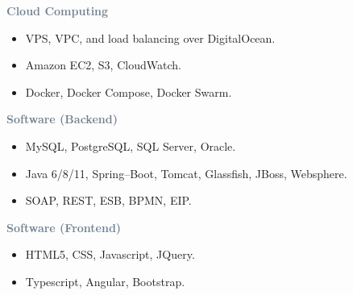 






\textcolor{SlateGrey}{\textbf{Cloud Computing}}
\newline

\begin{itemize}
    \item VPS, VPC, and load balancing over DigitalOcean.
    \item Amazon EC2, S3, CloudWatch.
    \item Docker, Docker Compose, Docker Swarm.
\end{itemize}

\textcolor{SlateGrey}{\textbf{Software (Backend)}}
\newline

\begin{itemize}
    \item MySQL, PostgreSQL, SQL Server, Oracle.
    \item Java 6/8/11, Spring--Boot, Tomcat, Glassfish, JBoss, Websphere.
    \item SOAP, REST, ESB, BPMN, EIP.
\end{itemize}

\textcolor{SlateGrey}{\textbf{Software (Frontend)}}
\newline

\begin{itemize}
    \item HTML5, CSS, Javascript, JQuery.
    \item Typescript, Angular, Bootstrap.
\end{itemize}




